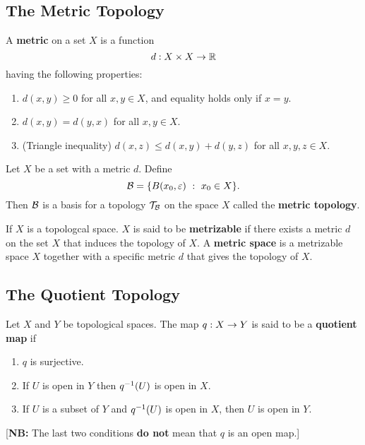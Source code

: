 \subsection{The Metric Topology}\nl
\setcounter{section}{20}
\setcounter{thm}{0}

\vs

\dfn A \textbf{metric} on a set $X$ is a function
\[d:X\times X \rightarrow \mathbb{R}\]
having the following properties:
\begin{enumerate}
    \item $d(x,y)\geq 0$ for all $x,y\in X$, and equality holds only if $x = y$.
    \item $d(x,y) = d(y,x)$ for all $x,y\in X$.
    \item (Triangle inequality) $d(x,z) \leq d(x,y) + d(y,z)$ for all $x,y,z\in X$.
\end{enumerate}

\vs


\dfn Let $X$ be a set with a metric $d$. Define 
\[\mathcal{B} = \{B(x_0,\varepsilon)\ :\ x_0\in X\}.\]
Then $\mathcal{B}$ is a basis for a topology $\mathcal{T}_{\mathcal{B}}$ on the space $X$ called the \textbf{metric topology}.


\vs

\dfn If $X$ is a topologcal space. $X$ is said to be \textbf{metrizable} if there exists a metric $d$ on the set $X$ that induces the topology of $X$. A \textbf{metric space} is a metrizable space $X$ together with a specific metric $d$ that gives the topology of $X$.






\subsection{The Quotient Topology}\nl
\setcounter{section}{22}
\setcounter{thm}{0}

\vs

\dfn Let $X$ and $Y$ be topological spaces. The map $q:X\rightarrow Y$ is said to be a \textbf{quotient map} if 
\begin{enumerate}
    \item $q$ is surjective.
    \item If $U$ is open in $Y$ then $q^{-1}(U)$ is open in $X$.
    \item If $U$ is a subset of $Y$ and $q^{-1}(U)$ is open in $X$, then $U$ is open in $Y$.
\end{enumerate}
\hspace{1.2em}[\textbf{NB:} The last two conditions \textbf{do not} mean that $q$ is an open map.]

